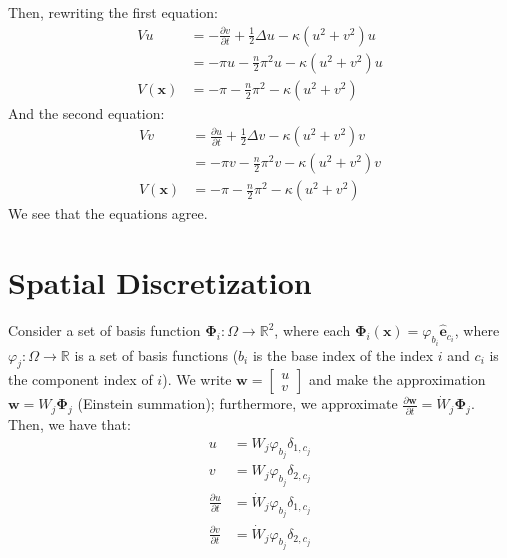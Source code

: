 \documentclass{article}
\newcommand{\bvec}[1]{\boldsymbol{#1}}
\newcommand{\brvec}[1]{\mathbf{#1}}
\begin{document}
Then, rewriting the first equation:
\begin{align*}
    V u & = -\frac{\partial v}{\partial t} + \frac{1}{2} \Delta u - \kappa (u^2 + v^2) u \\
        & = -\pi u - \frac{n}{2} \pi^2 u - \kappa (u^2 + v^2) u \\
    V(\bvec{x}) & = -\pi - \frac{n}{2} \pi^2 - \kappa (u^2 + v^2)
\end{align*}
\noindent And the second equation:
\begin{align*}
    V v & = \frac{\partial u}{\partial t} + \frac{1}{2} \Delta v - \kappa (u^2 + v^2) v \\
        & = -\pi v - \frac{n}{2} \pi^2 v - \kappa (u^2 + v^2) v \\
    V(\bvec{x}) & = -\pi - \frac{n}{2} \pi^2 - \kappa (u^2 + v^2)
\end{align*}
\noindent We see that the equations agree.

\newpage

\section{Spatial Discretization}

Consider a set of basis function $\bvec{\Phi}_i : \Omega \rightarrow \mathbb{R}^2$,
where each $\bvec{\Phi}_i(\bvec{x}) = \varphi_{b_i} \hat{\brvec{e}}_{c_i}$,
where $\varphi_j : \Omega \rightarrow \mathbb{R}$ is a set of basis functions
($b_i$ is the base index of the index $i$ and $c_i$ is the component index of $i$).
We write $\bvec{w} = \begin{bmatrix}
    u \\
    v
\end{bmatrix}$ and make the approximation $\bvec{w} = W_j \bvec{\Phi}_j$ (Einstein summation);
furthermore, we approximate $\frac{\partial \bvec{w}}{\partial t} = \dot{W}_j \bvec{\Phi}_j$.
Then, we have that:
\begin{align*}
    u & = W_j \varphi_{b_j} \delta_{1, c_j} \\
    v & = W_j \varphi_{b_j} \delta_{2, c_j} \\
    \frac{\partial u}{\partial t} & = \dot{W}_j \varphi_{b_j} \delta_{1, c_j} \\
    \frac{\partial v}{\partial t} & = \dot{W}_j \varphi_{b_j} \delta_{2, c_j}
\end{align*}
\end{document}
